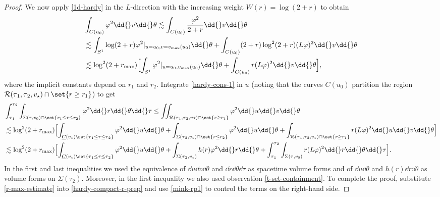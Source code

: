 \documentclass[10pt, reqno]{amsart}
\begin{document}
\begin{proof}
We now apply \cref{1d-hardy} in the \(L\)-direction with the increasing weight \(W(r) = \log (2 + r)\) to obtain
\begin{equation}\label{hardy-cons-1}
\begin{split}
&\int _{C(u_0)} \varphi^2\dd{}v\dd{}\theta{} \lesssim \int _{C(u_0)} \frac{\varphi^2}{2+r}\dd{}v\dd{}\theta{} \\
&\lesssim \int _{S^1} \log (2+r)\varphi^2|_{u=u_0,v=v_{\textnormal{max}}(u_0)}\dd{}\theta{} +  \int _{C(u_0)} (2+r)\log^2 (2+r)(L\varphi{})^2\dd{}v\dd{}\theta{} \\
&\lesssim \log^2(2+r_{\textnormal{max}})\Bigl[\int _{S^1} \varphi^2|_{u=u_0,v_{\textnormal{max}}(u_0)}\dd{}\theta{} +  \int _{C(u_0)} r(L\varphi{})^2\dd{}v\dd{}\theta{}\Bigr],
\end{split}
\end{equation}
where the implicit constants depend on \(r_1\) and \(r_2\). Integrate
\cref{hardy-cons-1} in \(u\) (noting that the curves \(C(u_0)\) partition the
region \(\mathcal{R}(\tau{}_1,\tau{}_2,v_\star{})\cap \set{r\ge r_1}\)) to get
\begin{equation}\label{hardy-compact-r-prep}
\begin{split}
&\int_{\tau{}_1}^{\tau{}_2}\int _{\Sigma{}(\tau{},v_0)\cap \set{r_1\le r\le r_2}}\varphi^2\dd{}r\dd{}\theta{}\dd{}\tau{}\le \iint_{\mathcal{R}(\tau{}_1,\tau{}_2,v\star{})\cap \set{r\ge r_1}}\varphi^2\dd{}u\dd{}v\dd{}\theta{} \\
&\lesssim \log ^2(2+r_{\textnormal{max}})\Bigl[\int _{\underline{C}(v_{{\star{}}})\set{\tau{}_1\le \tau{}\le \tau{}_2}} \varphi^2\dd{}u\dd{}\theta{} + \int _{\Sigma{}(\tau{}_2,v_{\star{}})\cap \set{r\le r_2}} \varphi^2\dd{}u\dd{}\theta{} + \int _{\mathcal{R}(\tau{}_1,\tau{}_2,v_\star{})\cap \set{r\ge r_1}} r(L\varphi{})^2\dd{}u\dd{}v\dd{}\theta{}\Bigr] \\
&\lesssim \log ^2(2+r_{\textnormal{max}})\Bigl[\int _{\underline{C}(v_{\star{}})\set{\tau{}_1\le \tau{}\le \tau{}_2}} \varphi^2\dd{}u\dd{}\theta{} + \int _{\Sigma{}(\tau{}_2,v_{\star{}})} h(r)\varphi^2\dd{}r\dd{}\theta{} + \int_{\tau{}_1}^{\tau{}_2} \int _{\Sigma{}(\tau{},v_0)} r(L\varphi{})^2\dd{}r\dd{}\theta{}\dd{}\tau{}\Bigr].
\end{split}
\end{equation}
In the first and last inequalities we used the equivalence of
\(\dd{}u\dd{}v\dd{}\theta{}\) and \(\dd{}r\dd{}\theta{}\dd{}\tau{}\) as
spacetime volume forms and of \(\dd{}u\dd{}\theta{}\) and
\(h(r)\dd{}r\dd{}\theta{}\) as volume forms on \(\Sigma{}(\tau_2)\). Moreover,
in the first inequality we also used observation \cref{t-set-containment}. To
complete the proof, substitute \cref{r-max-estimate} into \cref{hardy-compact-r-prep}
and use \cref{mink-rp1} to control the terms on the right-hand side.
\end{proof}
\end{document}
